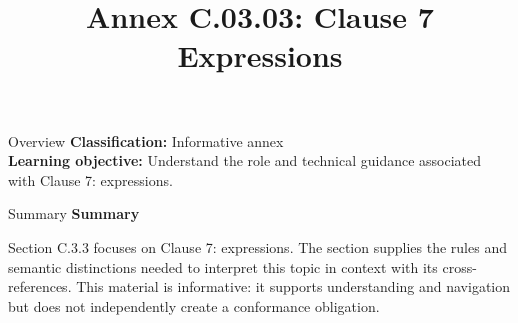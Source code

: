 \documentclass[10pt,letterpaper]{article}
\title{Annex C.03.03: Clause 7 Expressions}
\author{}
\date{}
\begin{document}
\maketitle
\begin{CornellOverviewBox}{Overview}
\textbf{Classification:} Informative annex\\[2pt]
\textbf{Learning objective:} Understand the role and technical guidance associated with Clause 7: expressions.
\end{CornellOverviewBox}\begin{CornellSummaryBox}{Summary}
{\sffamily\bfseries\color{Accent} Summary}\par\vspace{3pt}Section C.3.3 focuses on Clause 7: expressions. The section supplies the rules and semantic distinctions needed to interpret this topic in context with its cross-references. This material is informative: it supports understanding and navigation but does not independently create a conformance obligation.
\end{CornellSummaryBox}
\end{document}
